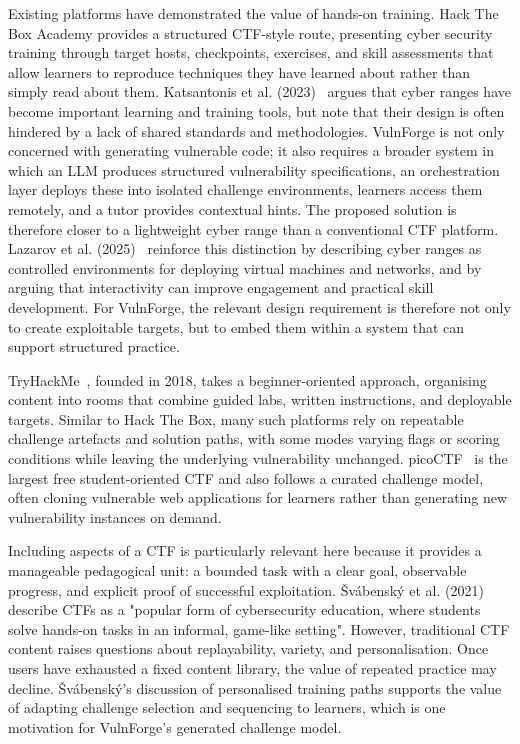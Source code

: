 Existing platforms have demonstrated the value of hands-on training. Hack The Box Academy provides a structured CTF-style route, presenting cyber security training through target hosts, checkpoints, exercises, and skill assessments that allow learners to reproduce techniques they have learned about rather than simply read about them. Katsantonis et al. (2023)~\citep{katsantonis_cyber_2023} argues that cyber ranges have become important learning and training tools, but note that their design is often hindered by a lack of shared standards and methodologies. VulnForge is not only concerned with generating vulnerable code; it also requires a broader system in which an LLM produces structured vulnerability specifications, an orchestration layer deploys these into isolated challenge environments, learners access them remotely, and a tutor provides contextual hints. The proposed solution is therefore closer to a lightweight cyber range than a conventional CTF platform. Lazarov et al. (2025)~\citep{lazarov_lessons_2025} reinforce this distinction by describing cyber ranges as controlled environments for deploying virtual machines and networks, and by arguing that interactivity can improve engagement and practical skill development. For VulnForge, the relevant design requirement is therefore not only to create exploitable targets, but to embed them within a system that can support structured practice.

TryHackMe~\citep{noauthor_tryhackme_nodate}, founded in 2018, takes a beginner-oriented approach, organising content into rooms that combine guided labs, written instructions, and deployable targets. Similar to Hack The Box, many such platforms rely on repeatable challenge artefacts and solution paths, with some modes varying flags or scoring conditions while leaving the underlying vulnerability unchanged. picoCTF~\citep{picoctf} is the largest free student-oriented CTF and also follows a curated challenge model, often cloning vulnerable web applications for learners rather than generating new vulnerability instances on demand.

Including aspects of a CTF is particularly relevant here because it provides a manageable pedagogical unit: a bounded task with a clear goal, observable progress, and explicit proof of successful exploitation. Švábenský et al. (2021)~\citep{svabensky_automated_2024} describe CTFs as a "popular form of cybersecurity education, where students solve hands-on tasks in an informal, game-like setting". However, traditional CTF content raises questions about replayability, variety, and personalisation. Once users have exhausted a fixed content library, the value of repeated practice may decline. Švábenský's discussion of personalised training paths supports the value of adapting challenge selection and sequencing to learners, which is one motivation for VulnForge's generated challenge model.

